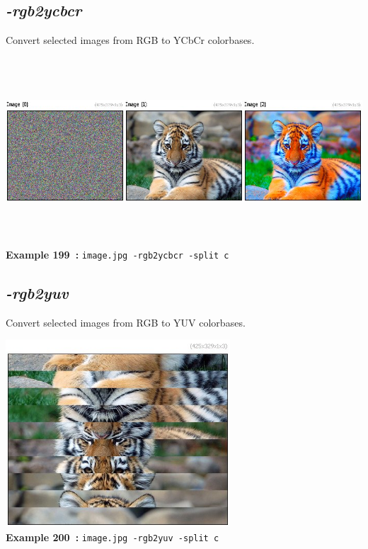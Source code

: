 \documentclass[a4paper,11pt,twoside]{book}
\begin{document}
\subsection{\emph{-rgb2ycbcr} }\vspace*{-0.5em}
Convert selected images from RGB to YCbCr colorbases.
\begin{center}\includegraphics[keepaspectratio=true,height=7cm,width=\textwidth]{img/gmic_def199.jpg}\\
{\footnotesize \textbf{Example 199~:} \texttt{image.jpg -rgb2ycbcr -split c}}
\end{center}

\subsection{\emph{-rgb2yuv} }\vspace*{-0.5em}
Convert selected images from RGB to YUV colorbases.
\begin{center}\includegraphics[keepaspectratio=true,height=7cm,width=\textwidth]{img/gmic_def200.jpg}\\
{\footnotesize \textbf{Example 200~:} \texttt{image.jpg -rgb2yuv -split c}}
\end{center}
\end{document}
